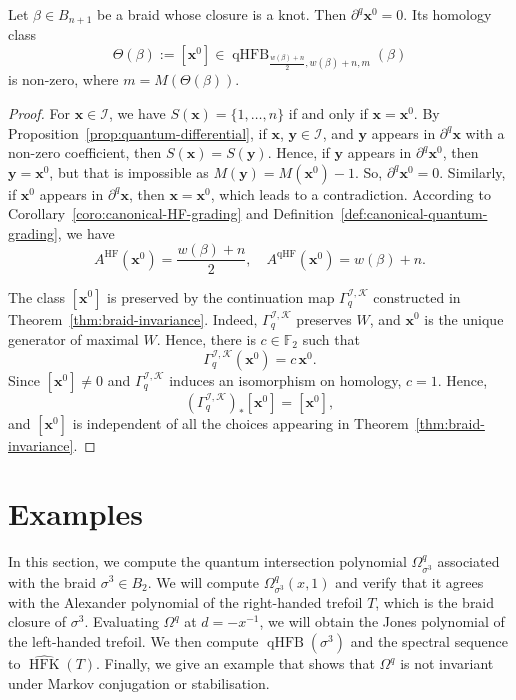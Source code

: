 \documentclass[11pt]{amsart}
\numberwithin{equation}{section}
\numberwithin{figure}{section}
\theoremstyle{definition}
\newcommand{\cI}{\mathcal{I}}
\newcommand{\cK}{\mathscr{K}}
\newcommand{\bF}{\mathbb{F}}
\newcommand{\sI}{\mathscr{I}}
\DeclareMathOperator{\qHF}{qHF}
\DeclareMathOperator{\qHFB}{qHFB}
\DeclareMathOperator{\HF}{HF}
\DeclareMathOperator{\HFK}{HFK}
\newcommand{\HFKh}{\widehat{\HFK}}
\newcommand{\xs}{\boldsymbol{x}}
\newcommand{\ys}{\boldsymbol{y}}
\begin{document}
\begin{prop}\label{prop:theta}
    Let $\beta \in B_{n+1}$ be a braid whose closure is a knot. Then $\partial^q \xs^0 = 0$. Its homology class
    \[
    \Theta(\beta) := [\xs^0] \in \qHFB_{\frac{w(\beta)+n}{2}, w(\beta)+n, m}(\beta)
    \]
    is non-zero, where $m = M(\Theta(\beta))$.
\end{prop}

\begin{proof}
    For $\xs \in \cI$, we have $S(\xs) = \{1,\dots,n\}$ if and only if $\xs = \xs^0$. By Proposition~\ref{prop:quantum-differential}, if $\xs$, $\ys \in \cI$, and $\ys$ appears in $\partial^q\xs$ with a non-zero coefficient, then $S(\xs) = S(\ys)$. Hence, if $\ys$ appears in $\partial^q \xs^0$, then $\ys = \xs^0$, but that is impossible as $M(\ys) = M(\xs^0)-1$. So, $\partial^q \xs^0 = 0$. Similarly, if $\xs^0$ appears in $\partial^q \xs$, then $\xs = \xs^0$, which leads to a contradiction. According to Corollary~\ref{coro:canonical-HF-grading} and Definition~\ref{def:canonical-quantum-grading}, we have 
    \[
    A^{\HF}(\xs^0) = \frac{w(\beta) + n}{2}, \quad A^{\qHF}(\xs^0) = w(\beta)+n.
    \]
    
    The class $[\xs^0]$ is preserved by the continuation map $\Gamma_q^{\sI, \cK}$ constructed in Theorem~\ref{thm:braid-invariance}. Indeed, $\Gamma_q^{\sI, \cK}$ preserves $W$, and $\xs^0$ is the unique generator of maximal $W$. Hence, there is $c \in \bF_2$ such that
    \[
    \Gamma_q^{\sI, \cK}(\xs^0) = c\,\xs^0.
    \]
    Since $[\xs^0] \neq 0$ and $\Gamma_q^{\sI, \cK}$ induces an isomorphism on homology, $c = 1$. Hence,
    \[
    (\Gamma_q^{\sI, \cK})_*[\xs^0] = [\xs^0],
    \] 
    and $[\xs^0]$ is independent of all the choices appearing in Theorem~\ref{thm:braid-invariance}.
\end{proof}


\section{Examples}\label{sec:examples}

In this section, we compute the quantum intersection polynomial $\Omega^q_{\sigma^3}$ associated with the braid $\sigma^3 \in B_2$. We will compute $\Omega^q_{\sigma^3}(x,1)$ and verify that it agrees with the Alexander polynomial of the right-handed trefoil $T$, which is the braid closure of $\sigma^3$. Evaluating $\Omega^q$ at $d = -x^{-1}$, we will obtain the Jones polynomial of the left-handed trefoil. We then compute $\qHFB(\sigma^3)$ and the spectral sequence to $\HFKh(T)$. Finally, we give an example that shows that $\Omega^q$ is not invariant under Markov conjugation or stabilisation.
\end{document}
